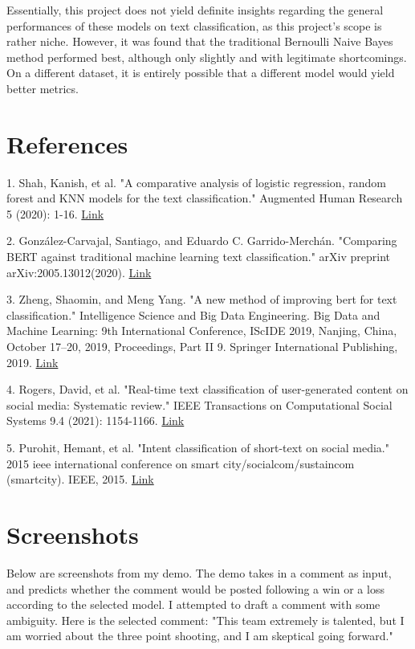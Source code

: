 \documentclass[twocolumn]{article}
\begin{document}
Essentially, this project does not yield definite insights regarding the general performances of these models on text classification, as this project's scope is rather niche. However, it was found that the traditional Bernoulli Naive Bayes method performed best, although only slightly and with legitimate shortcomings. On a different dataset, it is entirely possible that a different model would yield better metrics.


\section{References}



1. Shah, Kanish, et al. "A comparative analysis of logistic regression, random forest and KNN models for the text classification." Augmented Human Research 5 (2020): 1-16. \href{https://link.springer.com/article/10.1007/s41133-020-00032-0}{Link}


2. González-Carvajal, Santiago, and Eduardo C. Garrido-Merchán. "Comparing BERT against traditional machine learning text classification." arXiv preprint arXiv:2005.13012(2020). \href{https://arxiv.org/abs/2005.13012}{Link}


3. Zheng, Shaomin, and Meng Yang. "A new method of improving bert for text classification." Intelligence Science and Big Data Engineering. Big Data and Machine Learning: 9th International Conference, IScIDE 2019, Nanjing, China, October 17–20, 2019, Proceedings, Part II 9. Springer International Publishing, 2019. \href{https://link.springer.com/chapter/10.1007/978-3-030-36204-1_37}{Link}


4. Rogers, David, et al. "Real-time text classification of user-generated content on social media: Systematic review." IEEE Transactions on Computational Social Systems 9.4 (2021): 1154-1166. \href{https://ieeexplore.ieee.org/abstract/document/9585425}{Link}


5. Purohit, Hemant, et al. "Intent classification of short-text on social media." 2015 ieee international conference on smart city/socialcom/sustaincom (smartcity). IEEE, 2015. \href{https://ieeexplore.ieee.org/abstract/document/7463729}{Link}

\section{Screenshots}

Below are screenshots from my demo. The demo takes in a comment as input, and predicts whether the comment would be posted following a win or a loss according to the selected model. I attempted to draft a comment with some ambiguity. Here is the selected comment: "This team extremely is talented, but I am worried about the three point shooting, and I am skeptical going forward."
\end{document}
